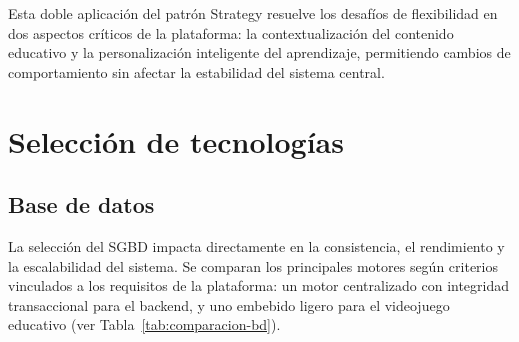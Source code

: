 Esta doble aplicación del patrón Strategy resuelve los desafíos de flexibilidad en dos aspectos críticos de la plataforma: la contextualización del contenido educativo y la personalización inteligente del aprendizaje, permitiendo cambios de comportamiento sin afectar la estabilidad del sistema central.

\section{Selección de tecnologías}

\subsection{Base de datos}

La selección del SGBD impacta directamente en la consistencia, el rendimiento y la escalabilidad del sistema. Se comparan los principales motores según criterios vinculados a los requisitos de la plataforma: un motor centralizado con integridad transaccional para el backend, y uno embebido ligero para el videojuego educativo (ver Tabla~\ref{tab:comparacion-bd}).

